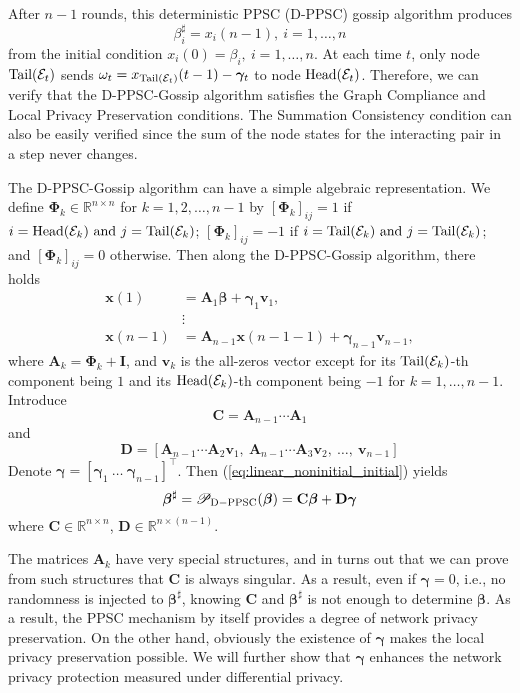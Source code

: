\documentclass[a4paper, 11pt]{article}
\newcommand{\R}{\mathbb{R}}
\newcommand{\1}{\mathbf{1}}
\newcommand{\asf}{\mathcal{E}}
\newcommand{\vb}{\mathbf{v}}
\newcommand{\xb}{\mathbf{x}}
\newcommand{\Ib}{\mathbf{I}}
\newcommand{\Ab}{\mathbf{A}}
\newcommand{\Cb}{\mathbf{C}}
\newcommand{\Db}{\mathbf{D}}
\newcommand{\Head}{\textnormal{Head}}
\newcommand{\Tail}{\textnormal{Tail}}
\newcommand{\gammab}{{\bm \gamma}}
\newcommand{\betab}{\bm{\beta}}
\newcommand{\Phib}{\bm{\Phi}}
\begin{document}
After $n-1$ rounds, this deterministic PPSC (D-PPSC) gossip algorithm produces 
$$
\beta_i^\sharp=x_i(n-1 ), \ i=1,\dots,n
$$
from the initial condition $x_i(0)=\beta_i,\ i=1,\dots,n$. At each time $t$, only node $\Tail(\asf_{t})$ sends
$
\omega_t = x_{\Tail(\asf_{t})}(t-1) - \gammab_t
$
to node $\Head(\asf_{t})$. Therefore, we can verify   that the D-PPSC-Gossip algorithm satisfies the Graph Compliance and Local Privacy Preservation conditions. The Summation Consistency condition can also be easily verified since the sum of the node states for the interacting pair in a step never changes. 


The D-PPSC-Gossip algorithm can have a simple algebraic representation. We define $\Phib_k\in\R^{n\times n}$ for $k=1,2,\dots,n-1 $ by $[\Phib_k]_{ij}=1$ {if} $i=\Head(\asf_k)\textnormal{ and }j=\Tail(\asf_k)$; $[\Phib_k]_{ij}=-1$ {if} $i=\Tail(\asf_k)\textnormal{ and }j=\Tail(\asf_k)$; and  $[\Phib_k]_{ij}=0$ otherwise.  
Then along the D-PPSC-Gossip algorithm, there holds
\begin{equation}\label{eq:linear_noninitial_initial}
\begin{aligned}
\xb(1)&=\Ab_1\betab+\gammab_1\vb_1,\\
&\vdots\\
\xb(n-1 )&=\Ab_{n-1 }\xb(n-1 -1)+\gammab_{n-1 }\vb_{n-1 },
\end{aligned}
\end{equation}
where $\Ab_k=\Phib_k+\Ib$, and $\vb_k$ is  the all-zeros vector except for its $\Tail(\asf_k)$-th component being $1$ and its $\Head(\asf_k)$-th component being $-1$ for $k=1,\dots,n-1 $. Introduce $$\Cb=\Ab_{n-1 }\cdots\Ab_1 
$$ and $$
\Db=[\Ab_{n-1 }\cdots\Ab_2\vb_1,\ \Ab_{n-1 }\cdots\Ab_3\vb_2,\ \dots,\ \vb_{n-1 }]  
$$ Denote $\gammab=[\gammab_1\ \dots\ \gammab_{n-1 }]^\top$. Then (\ref{eq:linear_noninitial_initial}) yields
\begin{equation}\label{eq:linear_final_initial}
\betab^\sharp=\mathscr{P}_{\rm D-PPSC}(\betab)=\Cb\betab+\Db\gammab
\end{equation}
where $\Cb\in \mathbb{R}^{n\times n}$, $\Db\in \mathbb{R}^{n\times (n-1)}.$

The matrices $\mathbf{A}_k$ have very special structures, and in turns out that  we can prove from such structures  that $\mathbf{C}$ is always singular. As a result, even if $\gammab=0$, i.e., no randomness is injected to $\betab^\sharp$, knowing $\mathbf{C}$ and $\betab^\sharp$ is not enough to determine $\betab$. As a result, the PPSC mechanism by itself provides a degree of network privacy preservation. On the other hand,  obviously the existence of $\gammab$ makes the local privacy preservation  possible. We will further  show that $\gammab$   enhances the network privacy protection measured under differential privacy.  
\end{document}
